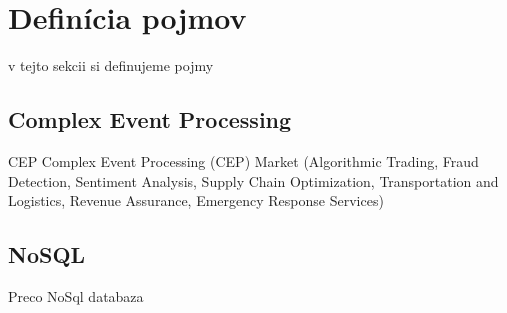 \chapter{Definícia pojmov}
v tejto sekcii si definujeme pojmy

\section{Complex Event Processing}
CEP
Complex Event Processing (CEP) Market (Algorithmic Trading, Fraud Detection, Sentiment Analysis, Supply Chain Optimization, Transportation and Logistics, Revenue Assurance, Emergency Response Services)

\section{NoSQL}
Preco NoSql databaza
